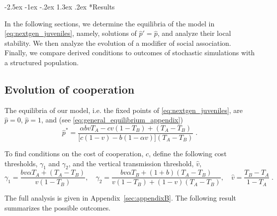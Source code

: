 \documentclass[12pt]{extarticle}
\makeatletter
\renewcommand\section{\@startsection {section}{1}{\z@}%
     {-2.5ex \@plus -1ex \@minus -.2ex}%
     {1.3ex \@plus.2ex}%
    {\Large\bfseries}}
\makeatother
\begin{document}
\section*{Results}

In the following sections, we determine the equilibria of the model in \autoref{eq:nextgen_juveniles}, namely, solutions of $\hat{p}' = \hat{p}$, and analyze their local stability.
We then analyze the evolution of a modifier of social association.
Finally, we compare derived conditions to outcomes of stochastic simulations with a structured population.

\subsection*{Evolution of cooperation}

The equilibria of our model, i.e. the fixed points of \autoref{eq:nextgen_juveniles}, are $\hat p=0$, $\hat p=1$, and (see \autoref{eq:general_equilibrium_appendix})
\begin{equation} \label{eq:general_equilibrium}
  \hat{p}^* =  
  \frac{\alpha bvT_A - cv(1-T_B) + (T_A-T_B)}{\big[c(1-v) - b (1-\alpha v)\big] (T_A-T_B)} \;.
\end{equation}

To find conditions on the cost of cooperation, $c$, define the following cost thresholds, $\gamma_1$ and $\gamma_2$, and the vertical transmission threshold, $\hat v$,
\begin{equation} \label{eq:cost_thresholds_v_threshold} 
\gamma_1 = \frac{b v \alpha T_A + (T_A - T_B)}{v(1-T_B)}, \quad
\gamma_2 = \frac{b v \alpha T_B + (1+b) (T_A - T_B)}{v(1-T_B) + (1-v)(T_A-T_B)}, \quad
\hat v = \frac{T_B - T_A}{1-T_A} \;.
\end{equation}

The full analysis is given in Appendix~\ref{sec:appendixB}.
The following result summarizes the possible outcomes.
\\
\end{document}
